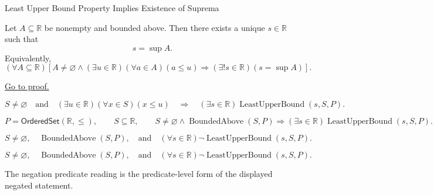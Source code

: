 \begin{theorembox}{Least Upper Bound Property Implies Existence of Suprema}
\begin{theorem}
\label{thm:lub-property-implies-existence-of-suprema}
Let $A\subseteq\mathbb{R}$ be nonempty and bounded above. Then there
exists a unique $s\in\mathbb{R}$ such that
\[
  s=\sup A.
\]
Equivalently,
\[
  (\forall A\subseteq\mathbb{R})
  \left[
    A\neq\varnothing
    \land
    (\exists u\in\mathbb{R})(\forall a\in A)(a\leq u)
    \Longrightarrow
    (\exists!s\in\mathbb{R})(s=\sup A)
  \right].
\]

\hyperref[prf:lub-property-implies-existence-of-suprema]{Go to proof.}
\end{theorem}
\end{theorembox}

\begin{remark*}
\[
  S\neq\varnothing
  \quad\text{and}\quad
  (\exists u\in\mathbb{R})(\forall x\in S)(x\leq u)
  \quad\Longrightarrow\quad
  (\exists s\in\mathbb{R})\operatorname{LeastUpperBound}(s,S,P).
\]
\end{remark*}

\begin{remark*}
\[
  P=\mathsf{OrderedSet}(\mathbb{R},\leq),\qquad S\subseteq\mathbb{R},\qquad
  S\neq\varnothing\land\operatorname{BoundedAbove}(S,P)
  \Longrightarrow
  (\exists s\in\mathbb{R})\operatorname{LeastUpperBound}(s,S,P).
\]
\end{remark*}

\begin{remark*}
\[
  S\neq\varnothing,\quad
  \operatorname{BoundedAbove}(S,P),
  \quad\text{and}\quad
  (\forall s\in\mathbb{R})\neg\operatorname{LeastUpperBound}(s,S,P).
\]
\end{remark*}

\begin{remark*}
\[
  S\neq\varnothing,\quad
  \operatorname{BoundedAbove}(S,P),
  \quad\text{and}\quad
  (\forall s\in\mathbb{R})\neg\operatorname{LeastUpperBound}(s,S,P).
\]

The negation predicate reading is the predicate-level form of the displayed negated statement.
\end{remark*}

